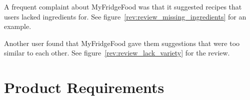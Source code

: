 A frequent complaint about MyFridgeFood was that it suggested
recipes that users lacked ingredients for. See figure~\ref{rev:review_missing_ingredients} for an example.

Another user found that MyFridgeFood gave them suggestions that were too similar to each
other. See figure~\ref{rev:review_lack_variety} for the review.

\section{Product Requirements}


\newcommand{\requirementtype}{FR}
\newcommand{\requirement}[4]{%
    \requirementtype\stepcounter{functionalreqcounter}\arabic{functionalreqcounter}%
    &\raggedright#1&#2&#3&#4\\}

